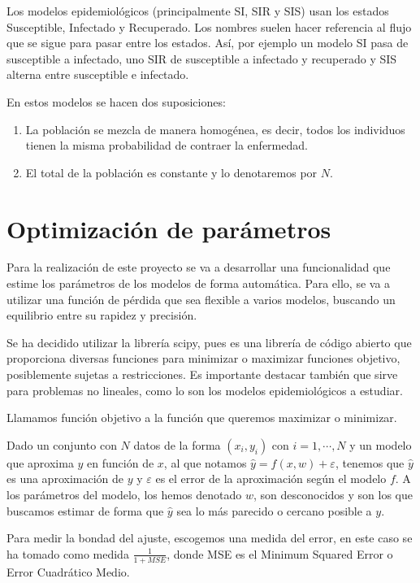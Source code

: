Los modelos epidemiológicos (principalmente SI, SIR y SIS) usan los estados Susceptible, Infectado y Recuperado. Los nombres suelen hacer referencia al flujo que se sigue para pasar entre los estados. Así, por ejemplo un modelo SI pasa de susceptible a infectado, uno SIR de susceptible a infectado y recuperado y SIS alterna entre susceptible e infectado.

En estos modelos se hacen dos suposiciones:
\begin{enumerate}
\item La población se mezcla de manera homogénea, es decir, todos los individuos tienen la misma probabilidad de contraer la enfermedad.
\item El total de la población es constante y lo denotaremos por $N$.
\end{enumerate}

\section{Optimización de parámetros}

Para la realización de este proyecto se va a desarrollar una funcionalidad que estime los parámetros de los modelos de forma automática. Para ello, se va a utilizar una función de pérdida que sea flexible a varios modelos, buscando un equilibrio entre su rapidez y precisión.

Se ha decidido utilizar la librería scipy, pues es una librería de código abierto que proporciona diversas funciones para minimizar o maximizar funciones objetivo, posiblemente sujetas a restricciones. Es importante destacar también que sirve para problemas no lineales, como lo son los modelos epidemiológicos a estudiar.

\begin{definition}
Llamamos función objetivo a la función que queremos maximizar o minimizar.
\end{definition}

Dado un conjunto con $N$ datos de la forma $(x_i,y_i)$ con $i=1,\cdots,N$ y un modelo que aproxima $y$ en función de $x$, al que notamos $\hat{y}=f(x,w)+\varepsilon$, tenemos que $\hat{y}$ es una aproximación de $y$ y $\varepsilon$ es el error de la aproximación según el modelo $f$. A los parámetros del modelo, los hemos denotado $w$, son desconocidos y son los que buscamos estimar de forma que $\hat{y}$ sea lo más parecido o cercano posible a $y$.

Para medir la bondad del ajuste, escogemos una medida del error, en este caso se ha tomado como medida $\frac{1}{1+MSE}$, donde MSE es el Minimum Squared Error o Error Cuadrático Medio.

